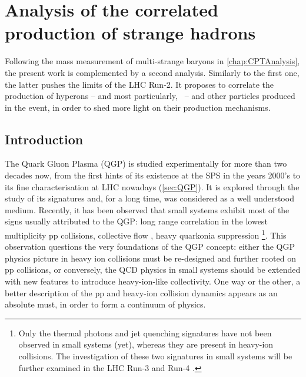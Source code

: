 \chapter{Analysis of the correlated production of strange hadrons}
\label{chap:CorrelatedAnalysis}

Following the mass measurement of multi-strange baryons in  \chap\ref{chap:CPTAnalysis}, the present work is complemented by a second analysis. Similarly to the first one, the latter pushes the limits of the LHC Run-2. It proposes to correlate the production of hyperons -- and most particularly, \rmOmega\ -- and other particles produced in the event, in order to shed more light on their production mechanisms.

\section{Introduction}

The Quark Gluon Plasma (QGP) is studied experimentally for more than two decades now, from the first hints of its existence at the SPS in the years 2000's to its fine characterisation at LHC nowadays (\Sec\ref{sec:QGP}). It is explored through the study of its signatures and, for a long time, was considered as a well understood medium. Recently, it has been observed that small systems exhibit most of the signs usually attributed to the QGP: long range correlation in the lowest multiplicity pp collisions\cite{alicecollaborationALICESeesRidge}, collective flow \cite{cmscollaborationEvidenceCollectiveMultiparticle2015}\cite{alicecollaborationAnisotropicFlowFlow2022}, heavy quarkonia suppression \cite{singhCharmoniumSuppressionUltrarelativistic2022}\footnote{Only the thermal photons and jet quenching signatures have not been observed in small systems (yet), whereas they are present in heavy-ion collisions. The investigation of these two signatures in small systems will be further examined in the LHC Run-3 and Run-4 \cite{vanleeuwenHighlightsALICE59th}.}. This observation questions the very foundations of the QGP concept: either the QGP physics picture in heavy ion collisions must be re-designed and further rooted on pp collisions, or conversely, the QCD physics in small systems should be extended with new features to introduce heavy-ion-like collectivity. One way or the other, a better description of the pp and heavy-ion collision dynamics appears as an absolute must, in order to form a continuum of physics.

